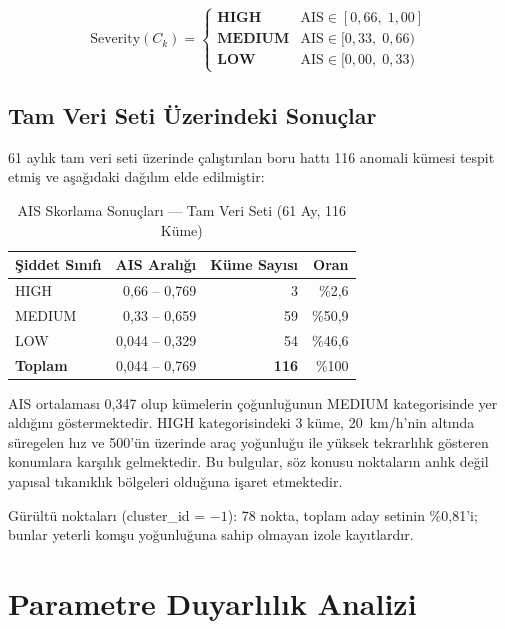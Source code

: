 \documentclass[12pt,a4paper]{article}
\begin{document}
\begin{equation}
\text{Severity}(C_k) =
\begin{cases}
\textbf{HIGH}   & \text{AIS} \in [0{,}66,\; 1{,}00] \\
\textbf{MEDIUM} & \text{AIS} \in [0{,}33,\; 0{,}66) \\
\textbf{LOW}    & \text{AIS} \in [0{,}00,\; 0{,}33)
\end{cases}
\end{equation}

\subsection{Tam Veri Seti Üzerindeki Sonuçlar}

61 aylık tam veri seti üzerinde çalıştırılan boru hattı 116 anomali kümesi tespit etmiş ve aşağıdaki dağılım elde edilmiştir:

\begin{table}[H]
\centering
\caption{AIS Skorlama Sonuçları — Tam Veri Seti (61 Ay, 116 Küme)}
\label{tab:ais-results}
\begin{tabular}{l r r r}
\toprule
\textbf{Şiddet Sınıfı} & \textbf{AIS Aralığı} & \textbf{Küme Sayısı} & \textbf{Oran} \\
\midrule
HIGH   & 0,66 -- 0,769 & 3  & \%2,6  \\
MEDIUM & 0,33 -- 0,659 & 59 & \%50,9 \\
LOW    & 0,044 -- 0,329 & 54 & \%46,6 \\
\midrule
\textbf{Toplam} & 0,044 -- 0,769 & \textbf{116} & \%100 \\
\bottomrule
\end{tabular}
\end{table}

AIS ortalaması 0,347 olup kümelerin çoğunluğunun MEDIUM kategorisinde yer aldığını göstermektedir. HIGH kategorisindeki 3 küme, 20~km/h'nin altında süregelen hız ve 500'ün üzerinde araç yoğunluğu ile yüksek tekrarlılık gösteren konumlara karşılık gelmektedir. Bu bulgular, söz konusu noktaların anlık değil yapısal tıkanıklık bölgeleri olduğuna işaret etmektedir.

Gürültü noktaları (cluster\_id = $-1$): 78 nokta, toplam aday setinin \%0,81'i; bunlar yeterli komşu yoğunluğuna sahip olmayan izole kayıtlardır.

\section{Parametre Duyarlılık Analizi}
\label{sec:sensitivity}
\end{document}
